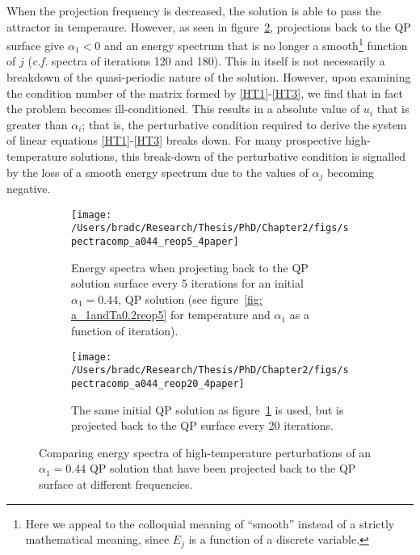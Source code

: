 \documentclass[../PhD.tex]{subfiles}
\begin{document}
When the projection frequency is decreased, the solution is able to pass the attractor in temperaure. However, as seen in figure~\ref{fig: spec comparisons reop20}, projections back to the QP surface give $\alpha_1 < 0$ and an energy spectrum that is no longer a smooth\footnote{Here we appeal to the colloquial meaning of ``smooth'' instead of a strictly mathematical meaning, since $E_j$ is a function of a discrete variable.} function of $j$ ({\it c.f.} spectra of iterations 120 and 180). This in itself is not necessarily a breakdown of the quasi-periodic nature of the solution. However, upon examining the condition number of the matrix formed by \eqref{HT1}-\eqref{HT3}, we find that in fact the problem becomes ill-conditioned. This results in a absolute value of $u_i$ that is greater than $\alpha_i$; that is, the perturbative condition required to derive the system of linear equations \eqref{HT1}-\eqref{HT3} breaks down. For many prospective high-temperature solutions, this break-down of the perturbative condition is signalled by the loss of a smooth energy spectrum due to the values of $\alpha_j$ becoming negative. 

\vspace{0.1in}

\begin{figure}[H]
	\centering
	\begin{subfigure}[t]{0.47\textwidth}
		\texttt{[image: /Users/bradc/Research/Thesis/PhD/Chapter2/figs/spectracomp\_a044\_reop5\_4paper]}
		\caption{Energy spectra when projecting back to the QP solution surface every 5 iterations for an initial ${\alpha_1 = 0.44}$, QP solution (see figure~\ref{fig: a_1andTa0.2reop5} for temperature and $\alpha_1$ as a function of iteration).}
		\label{fig: spec comparisons reop5}
	\end{subfigure}
	\hfill
	\begin{subfigure}[t]{0.47\textwidth}
		\texttt{[image: /Users/bradc/Research/Thesis/PhD/Chapter2/figs/spectracomp\_a044\_reop20\_4paper]}
		\caption{The same initial QP solution as figure~\ref{fig: spec comparisons reop5} is used, but is projected back to the QP surface every 20 iterations.}
		\label{fig: spec comparisons reop20}
	\end{subfigure}
	\caption[Energy spectra resulting from perturbing the same QP solution at differing frequencies]{Comparing energy spectra of high-temperature perturbations of an $\alpha_1=0.44$ QP solution that have been projected back to the QP surface at different frequencies.}
	\label{fig: spec comps with reop}
\end{figure}
\end{document}
